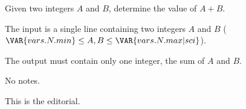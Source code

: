 Given two integers $A$ and $B$, determine the value of $A + B$.

The input is a single line containing two integers $A$ and $B$ ($\VAR{vars.N.min} \leq A, B \leq \VAR{vars.N.max | sci}$).

The output must contain only one integer, the sum of $A$ and $B$.

No notes.

This is the editorial.
